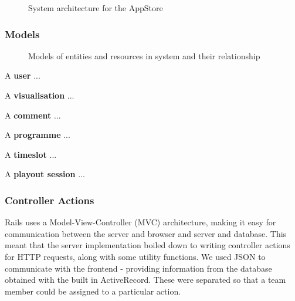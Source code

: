 \documentclass[a4paper, titlepage]{article}
\begin{document}
\begin{figure}[ht]
  \centering
  \caption{System architecture for the AppStore}
  \label{fig:impl_models}
\end{figure}


\subsubsection{Models}

\begin{figure}[ht]
  \centering
  \caption{Models of entities and resources in system and their relationship}
  \label{fig:impl_models}
\end{figure}


A \textbf{user} ...

A \textbf{visualisation} ...

A \textbf{comment} ...

A \textbf{programme} ...

A \textbf{timeslot} ...

A \textbf{playout session} ...


\subsubsection{Controller Actions}

Rails uses a Model-View-Controller (MVC) architecture, making it easy for communication between the 
server and browser and server and database. This meant that the server implementation boiled down to
writing controller actions for HTTP requests, along with some utility functions. We used JSON to 
communicate with the frontend - providing information from the database obtained with the built in 
ActiveRecord. These were separated so that a team member could be assigned to a particular action.   

\end{document}
